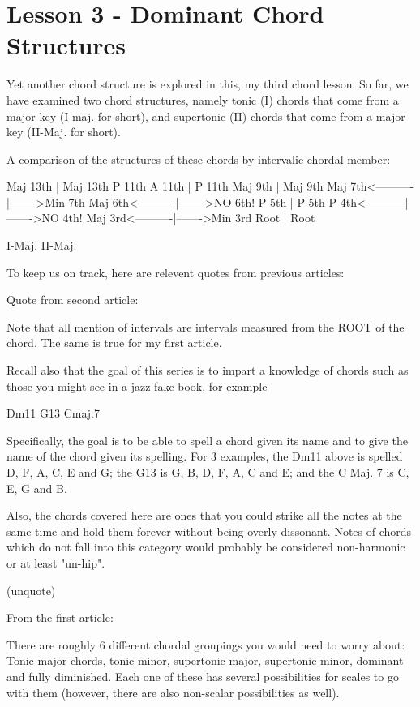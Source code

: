 \section{Lesson 3 - Dominant Chord Structures}

Yet another chord structure is explored in this, my third chord lesson.
So far, we have examined two chord structures, namely tonic (I) chords
that come from a major key (I-maj. for short), and supertonic (II) 
chords that come from a major key (II-Maj. for short).

A comparison of the structures of these chords by intervalic chordal member:

        Maj 13th          |        Maj 13th
         P 11th   A 11th  |         P 11th
        Maj 9th           |        Maj 9th
        Maj 7th<----------|------->Min 7th 
        Maj 6th<----------|------->NO 6th!
         P 5th            |         P 5th
         P 4th<-----------|------->NO 4th!
        Maj 3rd<----------|------->Min 3rd
         Root             |         Root

        I-Maj.                     II-Maj.

To keep us on track, here are relevent quotes from previous articles:

Quote from second article:

Note that all mention of intervals are intervals measured from the ROOT
of the chord. The same is true for my first article.

Recall also that the goal of this series is to impart a knowledge of
chords such as those you might see in a jazz fake book, for example

Dm11     G13     Cmaj.7

Specifically, the goal is to be able to spell a chord given its name and
to give the name of the chord given its spelling. For 3 examples, the
Dm11 above is spelled D, F, A, C, E and G; the G13 is G, B, D, F, A, C
and E; and the C Maj. 7 is C, E, G and B.

Also, the chords covered here are ones that you could strike all the
notes at the same time and hold them forever without being overly
dissonant. Notes of chords which do not fall into this category would
probably be considered non-harmonic or at least "un-hip".

(unquote)

From the first article:

There are roughly 6 different chordal groupings you would need to worry about:
Tonic major chords, tonic minor, supertonic major, supertonic minor, dominant
and fully diminished. Each one of these has several possibilities for scales
to go with them (however, there are also non-scalar possibilities as well).

